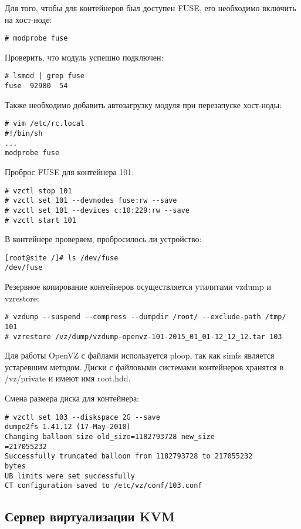 Для того, чтобы для контейнеров был доступен FUSE, его необходимо включить на хост-ноде:
\begin{lstlisting}
# modprobe fuse
\end{lstlisting}

Проверить, что модуль успешно подключен:
\begin{lstlisting}
# lsmod | grep fuse
fuse  92980  54
\end{lstlisting}

Также необходимо добавить автозагрузку модуля при перезапуске хост-ноды:
\begin{lstlisting}
# vim /etc/rc.local
#!/bin/sh
...
modprobe fuse
\end{lstlisting}

Проброс FUSE для контейнера 101:
\begin{lstlisting}
# vzctl stop 101
# vzctl set 101 --devnodes fuse:rw --save
# vzctl set 101 --devices c:10:229:rw --save
# vzctl start 101
\end{lstlisting}

В контейнере проверяем, пробросилось ли устройство:
\begin{lstlisting}
[root@site /]# ls /dev/fuse
/dev/fuse
\end{lstlisting}

Резервное копирование контейнеров осуществляется утилитами vzdump и vzrestore:
\begin{lstlisting}
# vzdump --suspend --compress --dumpdir /root/ --exclude-path /tmp/ 101
# vzrestore /vz/dump/vzdump-openvz-101-2015_01_01-12_12_12.tar 103
\end{lstlisting}

Для работы OpenVZ с файлами используется ploop, так как simfs является устаревшим методом.
Диски с файловыми системами контейнеров хранятся в /vz/private и имеют имя root.hdd.

Смена размера диска для контейнера:
\begin{lstlisting}
# vzctl set 103 --diskspace 2G --save
dumpe2fs 1.41.12 (17-May-2010)
Changing balloon size old_size=1182793728 new_size
=217055232
Successfully truncated balloon from 1182793728 to 217055232
bytes
UB limits were set successfully
CT configuration saved to /etc/vz/conf/103.conf
\end{lstlisting}

\subsection{Сервер виртуализации KVM}

